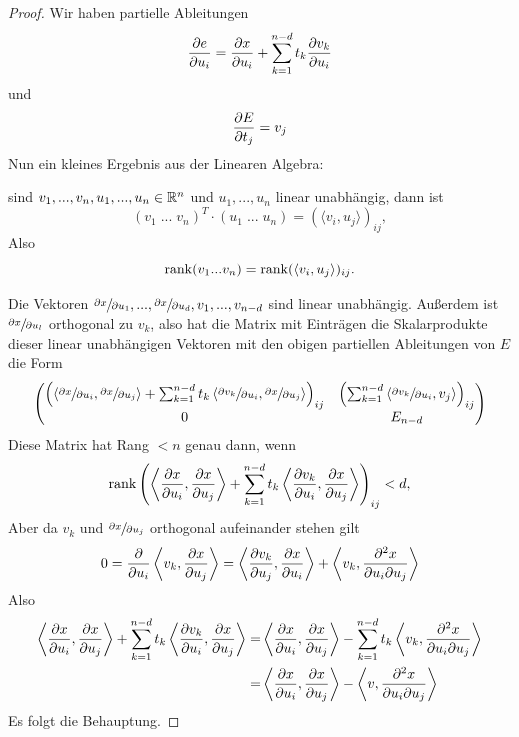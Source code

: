 \begin{proof}
    Wir haben partielle Ableitungen
    \[ \pderive[e]{u_i} = \pderive[x]{u_i} + \sum_{k = 1}^{n - d} t_k \pderive[v_k]{u_i} \]
    und 
    \[ \pderive[E]{t_j} = v_j \]
    Nun ein kleines Ergebnis aus der Linearen Algebra:

    sind $v_1, ..., v_n, u_1, ..., u_n \in { \mathbb R }^n$ und $u_1, ..., u_n$ linear unabhängig, 
    dann ist
    \[ (v_1 \; ... \; v_n)^T \cdot (u_1 \; ... \; u_n) = (\langle v_i, u_j \rangle)_{ij} , \]
    Also 
    \[ { \operatorname{rank} } (v_1 ... v_n) = { \operatorname{rank} } (\langle v_i, u_j \rangle)_{ij} . \]

    Die Vektoren $ \pderive[x]{u_1}, ..., \pderive[x]{u_d}, v_1, ..., v_{n - d}$ sind linear
    unabhängig. Außerdem ist $\pderive[x]{u_l}$ orthogonal zu $v_k$, also hat die Matrix mit 
    Einträgen die Skalarprodukte dieser linear unabhängigen Vektoren mit den obigen partiellen
    Ableitungen von $E$ die Form 
    \[
        \begin{pmatrix}
            \left( \left\langle \pderive[x]{u_i}, \pderive[x]{u_j} \right\rangle + 
                \sum_{k = 1}^{n - d} t_k 
                \left\langle \pderive[v_k]{u_i} , \pderive[x]{u_j} \right\rangle \right)_{ij} &
            \left( \sum_{k = 1}^{n - d} 
                \left\langle \pderive[v_k]{u_i}, v_j \right\rangle \right)_{ij} \\
            0 & E_{n - d}
        \end{pmatrix}
    \]
    Diese Matrix hat Rang $< n$ genau dann, wenn 
    \[ \rank \left( \left\langle \pderive[x]{u_i}, \pderive[x]{u_j} \right\rangle + 
        \sum_{k = 1}^{n - d} t_k 
        \left\langle \pderive[v_k]{u_i} , \pderive[x]{u_j} \right\rangle \right)_{ij} < d 
    , \]
    Aber da $v_k$ und $\pderive[x]{u_j}$ orthogonal aufeinander stehen gilt 
    \[ 
        0 = \pderive{u_i} \left\langle v_k, \pderive[x]{u_j} \right\rangle
        = \left\langle \pderive[v_k]{u_j}, \pderive[x]{u_i} \right\rangle 
        + \left\langle v_k, \pdderive[x]{u_i}{u_j} \right\rangle
    \]
    Also 
    \begin{align*}
        \left\langle \pderive[x]{u_i}, \pderive[x]{u_j} \right\rangle + 
                \sum_{k = 1}^{n - d} t_k 
                \left\langle \pderive[v_k]{u_i} , \pderive[x]{u_j} \right\rangle
        = & \left\langle \pderive[x]{u_i}, \pderive[x]{u_j} \right\rangle - 
        \sum_{k = 1}^{n - d} t_k 
        \left\langle v_k , \pdderive[x]{u_i}{u_j} \right\rangle \\
        = & \left\langle \pderive[x]{u_i}, \pderive[x]{u_j} \right\rangle - 
        \left\langle v , \pdderive[x]{u_i}{u_j} \right\rangle
    \end{align*}
    Es folgt die Behauptung.
\end{proof}

